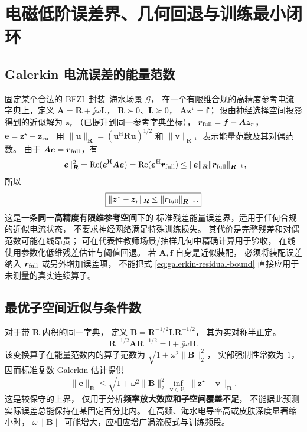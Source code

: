 \section{电磁低阶误差界、几何回退与训练最小闭环}\label{sec:error-algorithm}
\subsection{Galerkin 电流误差的能量范数}
固定某个合法的 BFZI--封装--海水场景 \(\mathcal G\)，
在一个有限维合规的高精度参考电流字典上，定义
\(\bm A=\bm R+\jj\omega\bm L\)，
\(\bm R\succ0\)、\(\bm L\succeq0\)，
\(\bm A\bm z^\star=\bm f\)；
设由神经选择空间投影得到的近似解为 \(\bm z_r\)
（已提升到同一参考字典坐标），
\(\bm r_{\rm full}=\bm f-\bm A\bm z_r\)，
\(\bm e=\bm z^\star-\bm z_r\)。
用 \(\|\bm u\|_{\bm R}
=(\bm u^{\mathrm H}\bm R\bm u)^{1/2}\)
和 \(\|\bm v\|_{\bm R^{-1}}\) 表示能量范数及其对偶范数。
由于 \(\bm A\bm e=\bm r_{\rm full}\)，有
\[
\|\bm e\|_{\bm R}^2
=\operatorname{Re}(\bm e^{\mathrm H}\bm A\bm e)
=\operatorname{Re}(\bm e^{\mathrm H}\bm r_{\rm full})
\le \|\bm e\|_{\bm R}\|\bm r_{\rm full}\|_{\bm R^{-1}},
\]
所以
\begin{equation}
\boxed{
\|\bm z^\star-\bm z_r\|_{\bm R}
\le \|\bm r_{\rm full}\|_{\bm R^{-1}}.
}
\label{eq:galerkin-residual-bound}
\end{equation}
这是一条\textbf{同一高精度有限维参考空间}下的
标准残差能量误差界，适用于任何合规的近似电流状态，
不要求神经网络满足特殊训练损失。
其代价是完整残差和对偶范数可能在线昂贵；
可在代表性教师场景/抽样几何中精确计算用于验收，
在线使用参数化低维残差估计与阈值回退。
若 \(\bm A,\bm f\) 自身是近似装配，
必须将装配误差纳入 \(\bm r_{\rm full}\) 或另外增加误差项，
不能把式 \eqref{eq:galerkin-residual-bound}
直接应用于未测量的真实连续算子。

\subsection{最优子空间近似与条件数}
对于带 \(\bm R\) 内积的同一字典，
定义 \(\bm B=\bm R^{-1/2}\bm L\bm R^{-1/2}\)，
其为实对称半正定。
\[
\bm R^{-1/2}\bm A\bm R^{-1/2}
=\mathsf I+\jj\omega\bm B.
\]
该变换算子在能量范数内的算子范数为
\(\sqrt{1+\omega^2\|\bm B\|_2^2}\)，
实部强制性常数为 \(1\)，
因而标准复数 Galerkin 估计提供
\begin{equation}
\|\bm e\|_{\bm R}
\le
\sqrt{1+\omega^2\|\bm B\|_2^2}
\inf_{\bm v\in\mathcal V_r}
\|\bm z^\star-\bm v\|_{\bm R}.
\label{eq:cea-complex}
\end{equation}
这是较保守的上界，
仅用于分析\textbf{频率放大效应和子空间覆盖不足}，
不能据此预测实际误差总能保持在某固定百分比内。
在高频、海水电导率高或皮肤深度显著缩小时，
\(\omega\|\bm B\|\) 可能增大，应相应增广涡流模式与训练频段。

